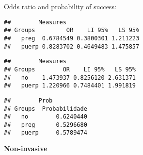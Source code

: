 \documentclass[
]{article}
\newenvironment{Shaded}{\begin{snugshade}}{\end{snugshade}}
\newcommand{\CommentTok}[1]{\textcolor[rgb]{0.56,0.35,0.01}{\textit{#1}}}
\newcommand{\KeywordTok}[1]{\textcolor[rgb]{0.13,0.29,0.53}{\textbf{#1}}}
\newcommand{\NormalTok}[1]{#1}
\newcommand{\OperatorTok}[1]{\textcolor[rgb]{0.81,0.36,0.00}{\textbf{#1}}}
\newcommand{\StringTok}[1]{\textcolor[rgb]{0.31,0.60,0.02}{#1}}
\begin{document}
Odds ratio and probability of success:

\begin{Shaded}
\end{Shaded}

\begin{verbatim}
##        Measures
## Groups         OR    LI 95%   LS 95%
##   preg  0.6784549 0.3800301 1.211223
##   puerp 0.8283702 0.4649483 1.475857
\end{verbatim}

\begin{Shaded}
\end{Shaded}

\begin{verbatim}
##        Measures
## Groups        OR    LI 95%   LS 95%
##   no    1.473937 0.8256120 2.631371
##   puerp 1.220966 0.7484401 1.991819
\end{verbatim}

\begin{Shaded}
\end{Shaded}

\begin{verbatim}
##        Prob
## Groups  Probabilidade
##   no        0.6240440
##   preg      0.5296680
##   puerp     0.5789474
\end{verbatim}

\textbf{Non-invasive}

\begin{Shaded}
\end{Shaded}
\end{document}
